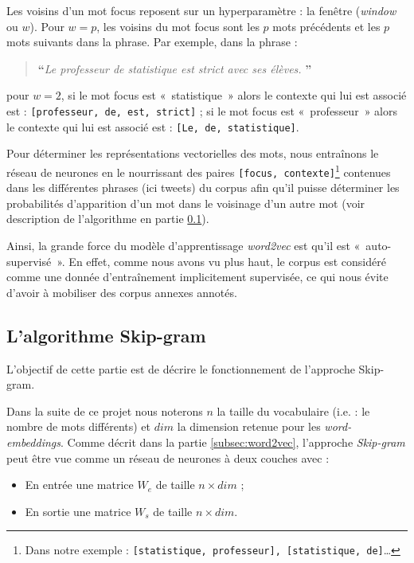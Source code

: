 \documentclass[11pt,french,french]{article}
\let\rmarkdownfootnote\footnote%
\def\footnote{\protect\rmarkdownfootnote}
\begin{document}
Les voisins d'un mot focus reposent sur un hyperparamètre : la fenêtre
(\emph{window} ou \(w\)). Pour \(w = p\), les voisins du mot focus sont
les \(p\) mots précédents et les \(p\) mots suivants dans la phrase. Par
exemple, dans la phrase :

\begin{quote}
\LARGE \textbf{``}\normalsize \emph{Le professeur de statistique est strict avec ses élèves.} \LARGE \textbf{''}\normalsize
\end{quote}

pour \(w=2\), si le mot focus est «~statistique~» alors le contexte qui
lui est associé est : \texttt{{[}professeur,\ de,\ est,\ strict{]}} ; si
le mot focus est «~professeur~» alors le contexte qui lui est associé
est : \texttt{{[}Le,\ de,\ statistique{]}}.

Pour déterminer les représentations vectorielles des mots, nous
entraînons le réseau de neurones en le nourrissant des paires
\texttt{{[}focus,\ contexte{]}}\footnote{Dans notre exemple :
  \texttt{{[}statistique,\ professeur{]},\ {[}statistique,\ de{]}}\dots}
contenues dans les différentes phrases (ici tweets) du corpus afin qu'il
puisse déterminer les probabilités d'apparition d'un mot dans le
voisinage d'un autre mot (voir description de l'algorithme en partie
\ref{sec:skipgram}).

Ainsi, la grande force du modèle d'apprentissage \emph{word2vec} est
qu'il est «~auto-supervisé~». En effet, comme nous avons vu plus haut,
le corpus est considéré comme une donnée d'entraînement implicitement
supervisée, ce qui nous évite d'avoir à mobiliser des corpus annexes
annotés.

\subsection{L'algorithme Skip-gram}\label{sec:skipgram}

L'objectif de cette partie est de décrire le fonctionnement de
l'approche Skip-gram.

Dans la suite de ce projet nous noterons \(n\) la taille du vocabulaire
(i.e. : le nombre de mots différents) et \(dim\) la dimension retenue
pour les \emph{word-embeddings}. Comme décrit dans la partie
\ref{subsec:word2vec}, l'approche \emph{Skip-gram} peut être vue comme
un réseau de neurones à deux couches avec :

\begin{itemize}
\item
  En entrée une matrice \(W_e\) de taille \(n\times dim\) ;
\item
  En sortie une matrice \(W_s\) de taille \(n\times dim\).
\end{itemize}
\end{document}
